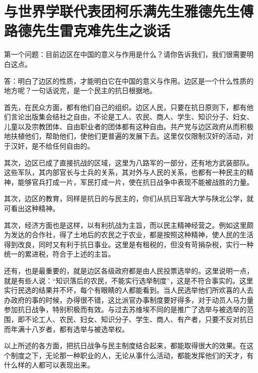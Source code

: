\section[与世界学联代表团柯乐满先生雅德先生傅路德先生雷克难先生之谈话（一九三八年七月二日）]{与世界学联代表团柯乐满先生雅德先生傅路德先生雷克难先生之谈话}


第一个问题：目前边区在中国的意义与作用是什么？请你告诉我们，我们很需要明白这点。

答：明白了边区的性质，才能明白它在中国的意义与作用。边区是一个什么性质的地方呢？一句话说完，是一个民主的抗日根据地。

首先，在民众方面，都有他们自己的组织。边区人民，只要在抗日原则下，都有他们言论出版集会结社之自由，不论是工人、农民、商人、学生、知识分子、妇女、儿童以及宗教团体、自由职业者的团体都有这种自由。共产党与边区政府从而积极地扶植他们，帮助他们，使他们更普遍的发展下去。这里仅仅限制汉奸的活动，对于汉奸，是不给任何自由的。

其次，边区已成了直接抗战的区域，这里为八路军的一部分，还有地方武装部队。这些军队，其内部官长与士兵的关系，其对外与人民的关系，也都有一种民主的精神，能够官兵打成一片，军民打成一片，使在抗日战争中表现不能被战胜的力量。

其次，边区的教育，同样是抗日的与民主的，你们从抗日军政大学与陕北公学，就可看出这种精神。

其次，经济方面也是这样，以有利抗战为主旨，而以民主精神经营之。例如这里颇为发达的合作社，得了土地后的农民之于农业，都是按照这种精神，使人民的生活得到改良，同时又有利于抗日事业。这里是有租税的，但没有苛捐杂税，实行一种统一的累进税，符合于上述的主旨。

还有，也是最重要的，就是边区各级政府都是由人民投票选举的。这里说明一点，就是有些人说：“知识落后的农民，不能实行选举制度”，这是不符合事实的。这里实行民选的结果并不坏，每个有眼睛的人都能看到。当人民选举他们所欢喜的人去办政府的事的时候，办得很不错，这比派官办事制度要好得多，对于动员人马力量参加抗日战争，特别积极而有效。与过去苏维埃不同的是推广了选举与被选举的范围，即不论工人、农民、妇女、知识分子、学生、商人、有产者，只要不反对抗日而年满十八岁者，都有选举与被选举权。

以上所述的各方面，把抗日战争与民主制度结合起来，都能取得很大的效果。在这个制度之下，无论那一种职业的人，无论从事什么活动，都能发挥他们的天才，有什么样的人都可以表现出来。

